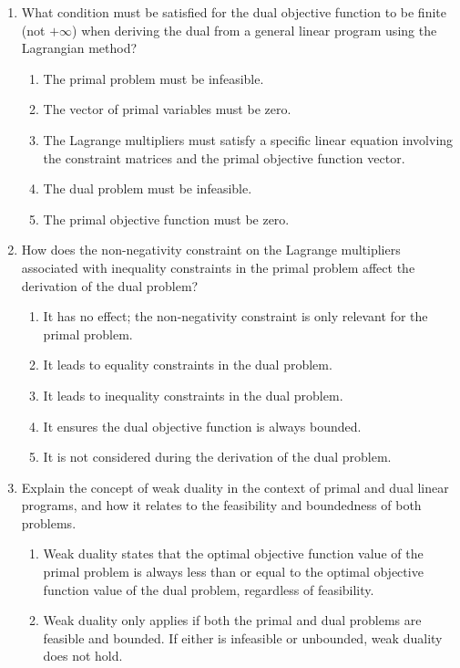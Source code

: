 \documentclass{article}%
\begin{document}
\begin{enumerate}
\begin{enumerate}
\end{enumerate}%
\vspace{1em}%
\item What condition must be satisfied for the dual objective function to be finite (not $+\infty$) when deriving the dual from a general linear program using the Lagrangian method?%
\begin{enumerate}%
\item The primal problem must be infeasible.%
\item The vector of primal variables must be zero.%
\item The Lagrange multipliers must satisfy a specific linear equation involving the constraint matrices and the primal objective function vector.%
\item The dual problem must be infeasible.%
\item The primal objective function must be zero.%
\end{enumerate}%
\vspace{1em}%
\item How does the non-negativity constraint on the Lagrange multipliers associated with inequality constraints in the primal problem affect the derivation of the dual problem?%
\begin{enumerate}%
\item It has no effect; the non-negativity constraint is only relevant for the primal problem.%
\item It leads to equality constraints in the dual problem.%
\item It leads to inequality constraints in the dual problem.%
\item It ensures the dual objective function is always bounded.%
\item It is not considered during the derivation of the dual problem.%
\end{enumerate}%
\vspace{1em}%
\item Explain the concept of weak duality in the context of primal and dual linear programs, and how it relates to the feasibility and boundedness of both problems.%
\begin{enumerate}%
\item Weak duality states that the optimal objective function value of the primal problem is always less than or equal to the optimal objective function value of the dual problem, regardless of feasibility.%
\item Weak duality only applies if both the primal and dual problems are feasible and bounded.  If either is infeasible or unbounded, weak duality does not hold.%

\end{enumerate}
\end{enumerate}
\end{document}
